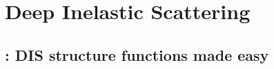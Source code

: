 
\chapter{Deep Inelastic Scattering}
\label{ch:dis}
\minitoc
\adjustmtc

\section{\yadism: DIS structure functions made easy}
\label{app/dis:yadism}

